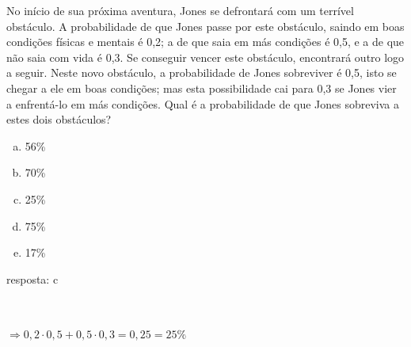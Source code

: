 \begin{ex}
  No início de sua próxima aventura, Jones se defrontará com um terrível obstáculo. A probabilidade de que Jones passe por este obstáculo, saindo em boas condições físicas e mentais é 0,2; a de que saia em más condições é 0,5, e a de que não saia com vida é 0,3. Se conseguir vencer este obstáculo, encontrará outro logo a seguir. Neste novo obstáculo, a probabilidade de Jones sobreviver é 0,5, isto se chegar a ele em boas condições; mas esta possibilidade cai para 0,3 se Jones vier a enfrentá-lo em más condições. Qual é a probabilidade de que Jones sobreviva a estes dois obstáculos?
    \begin{enumerate}[(a)]
    \item 56\%
    \item 70\%
    \item 25\%
    \item 75\%
    \item 17\%
    \end{enumerate}
      \begin{sol}
       resposta: c  \\  \\
       \\
       $\Rightarrow0,2\cdot0,5+0,5\cdot0,3=0,25=25\%$
      \end{sol}
\end{ex}